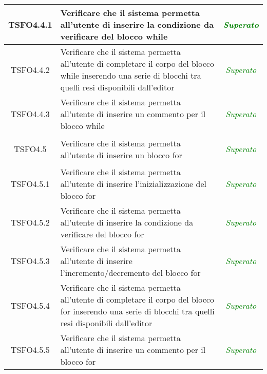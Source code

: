 \begin{longtable}{|c|>{}m{8cm}|c|}
\hypertarget{TSFO4.4.1}{TSFO4.4.1} & Verificare che il sistema permetta all'utente di inserire la condizione da verificare del blocco while & \textcolor{Green}{\textit{Superato}}\\ \hline
\hypertarget{TSFO4.4.2}{TSFO4.4.2} & Verificare che il sistema permetta all'utente di completare il corpo del blocco while inserendo una serie di blocchi tra quelli resi disponibili dall'editor & \textcolor{Green}{\textit{Superato}}\\ \hline
\hypertarget{TSFO4.4.3}{TSFO4.4.3} & Verificare che il sistema permetta all'utente di inserire un commento per il blocco while & \textcolor{Green}{\textit{Superato}}\\ \hline
\hypertarget{TSFO4.5}{TSFO4.5} & Verificare che il sistema permetta all'utente di inserire un blocco for & \textcolor{Green}{\textit{Superato}}\\ \hline
\hypertarget{TSFO4.5.1}{TSFO4.5.1} & Verificare che il sistema permetta all'utente di inserire l'inizializzazione del blocco for & \textcolor{Green}{\textit{Superato}}\\ \hline
\hypertarget{TSFO4.5.2}{TSFO4.5.2} & Verificare che il sistema permetta all'utente di inserire la condizione da verificare del blocco for & \textcolor{Green}{\textit{Superato}}\\ \hline
\hypertarget{TSFO4.5.3}{TSFO4.5.3} & Verificare che il sistema permetta all'utente di inserire l'incremento/decremento del blocco for & \textcolor{Green}{\textit{Superato}}\\ \hline
\hypertarget{TSFO4.5.4}{TSFO4.5.4} & Verificare che il sistema permetta all'utente di completare il corpo del blocco for inserendo una serie di blocchi tra quelli resi disponibili dall'editor & \textcolor{Green}{\textit{Superato}}\\ \hline
\hypertarget{TSFO4.5.5}{TSFO4.5.5} & Verificare che il sistema permetta all'utente di inserire un commento per il blocco for & \textcolor{Green}{\textit{Superato}}\\ \hline



\end{longtable}
